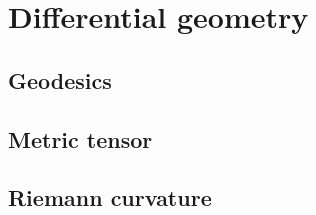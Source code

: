 \chapter{Differential geometry}

\section{Geodesics}

\section{Metric tensor}

\section{Riemann curvature}
